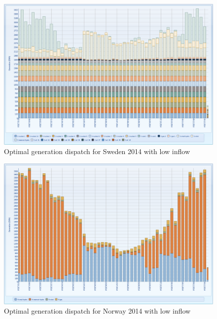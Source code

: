 \documentclass{article}
\begin{document}
\begin{figure}[htbp]
\begin{center}
\includegraphics[width=13cm,keepaspectratio=true]{figures/drycase/MTgenerationSdry}
\caption{Optimal generation dispatch for Sweden 2014 with low inflow}
\label{fig:MTgenerationSdry}
\end{center}
\end{figure}
\begin{figure}[htbp]
\begin{center}
\includegraphics[width=13cm,keepaspectratio=true]{figures/drycase/MTgenerationNdry}
\caption{Optimal generation dispatch for Norway 2014 with low inflow}
\label{fig:MTgenerationNdry}
\end{center}
\end{figure}
\end{document}
